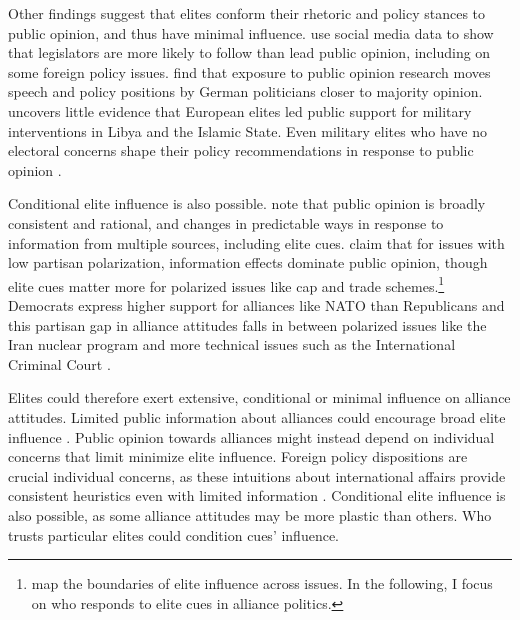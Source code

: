 \documentclass[12pt]{article}
\begin{document}
Other findings suggest that elites conform their rhetoric and policy stances to public opinion, and thus have minimal influence. 
\citet{Barberaetal2019} use social media data to show that legislators are more likely to follow than lead public opinion, including on some foreign policy issues. 
\citet{HagerHilbig2020} find that exposure to public opinion research moves speech and policy positions by German politicians closer to majority opinion. 
\citet{Haesebrouck2019} uncovers little evidence that European elites led public support for military interventions in Libya and the Islamic State. 
Even military elites who have no electoral concerns shape their policy recommendations in response to public opinion \citep{LinGreenberg2021}. 


Conditional elite influence is also possible. 
\citet{PageShapiro1992} note that public opinion is broadly consistent and rational, and changes in predictable ways in response to information from multiple sources, including elite cues. 
\citet{GuisingerSaunders2017} claim that for issues with low partisan polarization, information effects dominate public opinion, though elite cues matter more for polarized issues like cap and trade schemes.\footnote{\citet{GuisingerSaunders2017} map the boundaries of elite influence across issues. In the following, I focus on who responds to elite cues in alliance politics.}
Democrats express higher support for alliances like NATO than Republicans \citep{PewNATO2020} and this partisan gap in alliance attitudes falls in between polarized issues like the Iran nuclear program and more technical issues such as the International Criminal Court \citet{GuisingerSaunders2017}. 


Elites could therefore exert extensive, conditional or minimal influence on alliance attitudes. 
Limited public information about alliances could encourage broad elite influence \citep{Druckman2001}.
Public opinion towards alliances might instead depend on individual concerns that limit minimize elite influence.
Foreign policy dispositions are crucial individual concerns, as these intuitions about international affairs provide consistent heuristics even with limited information \citep{Herrmannetal2009, KertzerZeitzoff2017}.
Conditional elite influence is also possible, as some alliance attitudes may be more plastic than others. 
Who trusts particular elites could condition cues' influence.   
\end{document}
